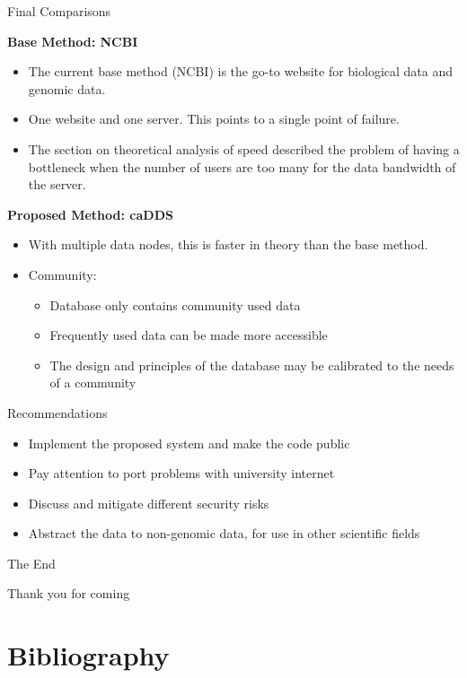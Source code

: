 \documentclass{beamer}
\begin{document}
\begin{frame}{Final Comparisons}
  \begin{block} {\textbf{Base Method: NCBI}}
    \begin{itemize}
        \item The current base method (NCBI) is the go-to website for biological data and genomic data. 
        \item One website and one server. This points to a single point of failure\cite{seqtorr}.
        \item The section on theoretical analysis of speed described the problem of having a bottleneck when the number of users are too many for the data bandwidth of the server. 
    \end{itemize}

  \end{block}
  
    \begin{block} {\textbf{Proposed Method: caDDS}}
    
    \begin{itemize}
        \item With multiple data nodes, this is faster in theory than the base method.
        \item  Community: \begin{itemize}
            \item Database only contains community used data
            \item Frequently used data can be made more accessible
            \item The design and principles of the database may be calibrated to the needs of a community
        \end{itemize}
    \end{itemize}
  \end{block}
\end{frame}


\begin{frame}{Recommendations}
  \begin{itemize}   
    \item Implement the proposed system and make the code public
    \item Pay attention to port problems with university internet
    \item Discuss and mitigate different security risks
    \item Abstract the data to non-genomic data, for use in other scientific fields
  \end{itemize}
\end{frame}

\begin{frame}
\Huge{\centerline{The End}}
\small{\centerline{Thank you for coming}}
\end{frame}

\section{Bibliography}

\begin{frame}[allowframebreaks]
\printbibliography[heading=none]
\end{frame}
\end{document}
